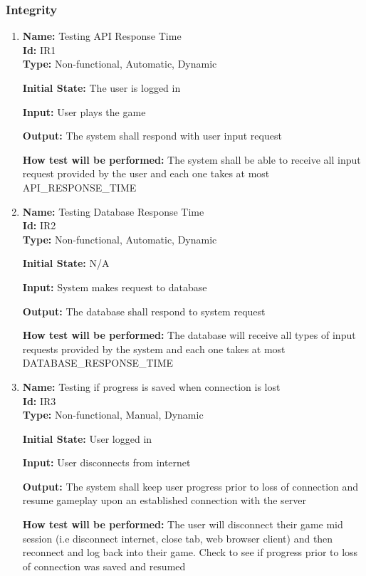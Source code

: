 \documentclass[12pt, titlepage]{article}
\begin{document}
\subsubsection{Integrity}
\begin{enumerate}
    \item{\textbf{Name:} Testing API Response Time \\} \label{Test-IR1}
    \textbf{Id:} IR1 \\
    
    \textbf{Type:} Non-functional, Automatic, Dynamic
    					
    \textbf{Initial State:} The user is logged in
    					
    \textbf{Input:} User plays the game
    					
    \textbf{Output:} The system shall respond with user input request
    					
    \textbf{How test will be performed:} The system shall be able to receive all input request provided by the user and each one takes at most API\_RESPONSE\_TIME
    
    \item{\textbf{Name:} Testing Database Response Time \\} \label{Test-IR2}
    \textbf{Id:} IR2 \\
    
    \textbf{Type:} Non-functional, Automatic, Dynamic
    					
    \textbf{Initial State:} N/A
    					
    \textbf{Input:} System makes request to database
    					
    \textbf{Output:} The database shall respond to system request
    					
    \textbf{How test will be performed:} The database will receive all types of input requests provided by the system and each one takes at most DATABASE\_RESPONSE\_TIME
    
    \item{\textbf{Name:} Testing if progress is saved when connection is lost \\} \label{Test-IR3}
    \textbf{Id:} IR3 \\
    
    \textbf{Type:} Non-functional, Manual, Dynamic
    					
    \textbf{Initial State:} User logged in
    					
    \textbf{Input:} User disconnects from internet
    					
    \textbf{Output:} The system shall keep user progress prior to loss of connection and resume gameplay upon an established connection with the server
    					
    \textbf{How test will be performed:} The user will disconnect their game mid session (i.e disconnect internet, close tab, web browser client) and then reconnect and log back into their game. Check to see if progress prior to loss of connection was saved and resumed
\end{enumerate}
\end{document}
